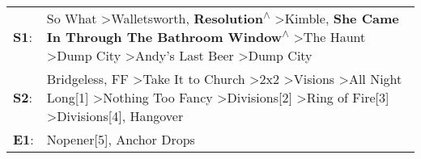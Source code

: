\begin{supertabular}{p{0.03\textwidth}p{0.92\textwidth}}
 \textbf{S1}:  &                                                     So What\textsuperscript{} \textgreater \enspace Walletsworth\textsuperscript{}, \enspace \textbf{Resolution\textsuperscript{$\wedge$}} \textgreater \enspace Kimble\textsuperscript{}, \enspace \textbf{She Came In Through The Bathroom Window\textsuperscript{$\wedge$}} \textgreater \enspace The Haunt\textsuperscript{} \textgreater \enspace Dump City\textsuperscript{} \textgreater \enspace Andy's Last Beer\textsuperscript{} \textgreater \enspace Dump City\textsuperscript{}  \enspace  \\
 \textbf{S2}:  &  Bridgeless\textsuperscript{}, \enspace FF\textsuperscript{} \textgreater \enspace Take It to Church\textsuperscript{} \textgreater \enspace 2x2\textsuperscript{} \textgreater \enspace Visions\textsuperscript{} \textgreater \enspace All Night Long[1]\textsuperscript{} \textgreater \enspace Nothing Too Fancy\textsuperscript{} \textgreater \enspace Divisions[2]\textsuperscript{} \textgreater \enspace Ring of Fire[3]\textsuperscript{} \textgreater \enspace Divisions[4]\textsuperscript{}, \enspace Hangover\textsuperscript{}  \enspace  \\
 \textbf{E1}:  &                                                                                                                                                                                                                                                                                                                                                                                                                                                                         Nopener[5]\textsuperscript{}, \enspace Anchor Drops\textsuperscript{}  \enspace  \\
\end{supertabular}
